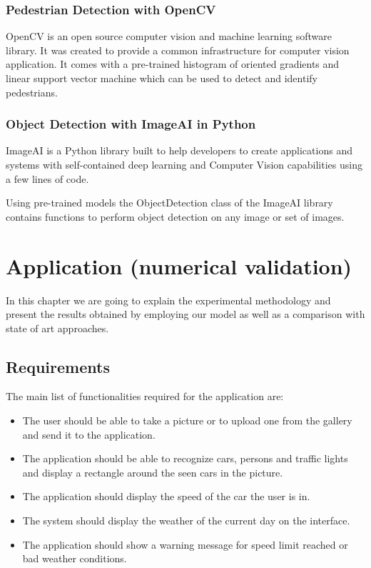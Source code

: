 \documentclass[runningheads,a4paper,11pt]{report}
\begin{document}
\subsection*{Pedestrian Detection with OpenCV}
OpenCV \cite{openCV} is an open source computer vision and machine learning software library. It was created to provide a common infrastructure for computer vision application. It comes with a pre-trained histogram of oriented gradients and linear support vector machine which can be used to detect and identify pedestrians.\cite{pedestrianDetection}

\subsection*{Object Detection with ImageAI in Python}
ImageAI \cite{Official73:online} is a Python library built to help developers to create applications and systems with self-contained deep learning and Computer Vision capabilities using a few lines of code.

Using pre-trained models the ObjectDetection class of the ImageAI library contains functions to perform object detection on any image or set of images.\cite{objectDetection}

\chapter{Application (numerical validation)}
\label{chapter:application}


In this chapter we are going to explain the experimental methodology and present the results obtained by employing our model as well as a comparison with state of art approaches.

\section{Requirements}
\label{section:requirements}

The main list of functionalities required for the application are:
\begin{itemize}
\item The user should be able to take a picture or to upload one from the gallery and send it to the application.
\item The application should be able to recognize cars, persons and traffic lights and display a rectangle around the seen cars in the picture.
\item The application should display the speed of the car the user is in. 
\item The system should display the weather of the current day on the interface.
\item The application should show a warning message for speed limit reached or bad weather conditions.
\end{itemize}
\end{document}
